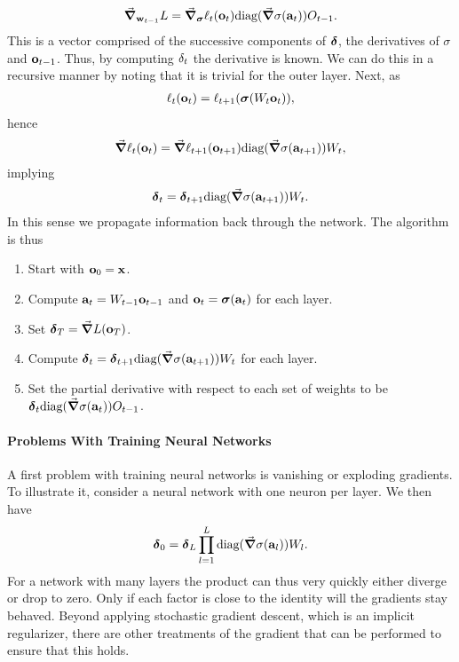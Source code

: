 \begin{align*}
	\grad_{\vb{w}_{t - 1}}L = \grad_{\vb*{\sigma}}\ell_{t}(\vb{o}_{t})\text{diag}(\grad\sigma(\vb{a}_{t}))O_{t - 1}.
\end{align*}
This is a vector comprised of the successive components of $\vb*{\delta}$, the derivatives of $\sigma$ and $\vb{o}_{t - 1}$. Thus, by computing $\vb{\delta}_{t}$ the derivative is known. We can do this in a recursive manner by noting that it is trivial for the outer layer. Next, as
\begin{align*}
	\ell_{t}(\vb{o}_{t}) = \ell_{t + 1}(\vb*{\sigma}(W_{t}\vb{o}_{t})),
\end{align*}
hence
\begin{align*}
	\grad\ell_{t}(\vb{o}_{t}) = \grad\ell_{t + 1}(\vb{o}_{t + 1})\text{diag}(\grad\sigma(\vb{a}_{t + 1}))W_{t},
\end{align*}
implying
\begin{align*}
	\vb*{\delta}_{t} = \vb*{\delta}_{t + 1}\text{diag}(\grad\sigma(\vb{a}_{t + 1}))W_{t}.
\end{align*}
In this sense we propagate information back through the network. The algorithm is thus
\begin{enumerate}
	\item Start with $\vb{o}_{0} = \vb{x}$.
	\item Compute $\vb{a}_{t} = W_{t - 1}\vb{o}_{t - 1}$ and $\vb{o}_{t} = \vb*{\sigma}(\vb{a}_{t})$ for each layer.
	\item Set $\vb*{\delta}_{T} = \grad{L}(\vb{o}_{T})$.
	\item Compute $\vb*{\delta}_{t} = \vb*{\delta}_{t + 1}\text{diag}(\grad\sigma(\vb{a}_{t + 1}))W_{t}$ for each layer.
	\item Set the partial derivative with respect to each set of weights to be $\vb*{\delta}_{t}\text{diag}(\grad\sigma(\vb{a}_{t}))O_{t - 1}$.
\end{enumerate}

\paragraph{Problems With Training Neural Networks}
A first problem with training neural networks is vanishing or exploding gradients. To illustrate it, consider a neural network with one neuron per layer. We then have
\begin{align*}
	\vb*{\delta}_{0}  = \vb*{\delta}_{L}\prod\limits_{l = 1}^{L}\text{diag}(\grad\sigma(\vb{a}_{l}))W_{l}.
\end{align*}
For a network with many layers the product can thus very quickly either diverge or drop to zero. Only if each factor is close to the identity will the gradients stay behaved. Beyond applying stochastic gradient descent, which is an implicit regularizer, there are other treatments of the gradient that can be performed to ensure that this holds.

